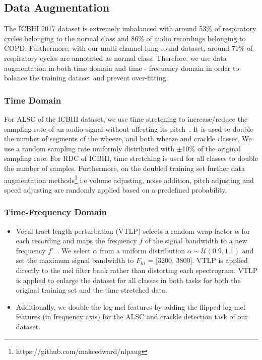 \documentclass[journal]{IEEEtran}
\begin{document}
\subsection{Data Augmentation}
The ICBHI 2017 dataset is extremely imbalanced with around 53\% of respiratory cycles belonging to the normal class and 86\% of audio recordings belonging to COPD. Furthermore, with our multi-channel lung sound dataset, around 71\% of respiratory cycles are annotated as normal class. Therefore, we use data augmentation in both time domain and time - frequency domain in order to balance the training dataset and prevent over-fitting. 
\subsubsection{Time Domain} 
For ALSC of the ICBHI dataset, we use time stretching to increase/reduce the sampling rate of an audio signal without affecting its pitch~\cite{driedger2016review}. It is used to double the number of segments of the wheeze, and both wheeze and crackle classes. We use a random sampling rate uniformly distributed with $\pm$10\% of the original sampling rate. For RDC of ICBHI, time stretching is used for all classes to double the number of samples. Furthermore, on the doubled training set further data augmentation methods\footnote{https://github.com/makcedward/nlpaug} i.e volume adjusting, noise addition, pitch adjusting and speed adjusting are randomly applied based on a predefined probability.

\subsubsection{Time-Frequency Domain}
\begin{itemize}
	\item Vocal tract length perturbation (VTLP) selects a random wrap factor $\alpha$ for each recording and maps the frequency $f$ of the signal bandwidth to a new frequency $f'$~\cite{jaitly2013vocal}. 
    We select $\alpha$ from a uniform distribution $\alpha \sim \mathcal{U}(0.9, 1.1)$ and set the maximum signal bandwidth to $F_{hi}$ = [3200, 3800]. VTLP is applied directly to the mel filter bank rather than distorting each spectrogram. VTLP is applied to enlarge the dataset for all classes in both tasks for both the original training set and the time stretched data.
	\item Additionally, we double the log-mel features by adding the flipped log-mel features (in frequency axis) for the ALSC and crackle detection task of our dataset.  
\end{itemize}  
\end{document}
